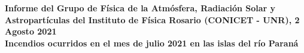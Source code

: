 \begin{center}
	\textbf{
		\textcolor{title}{Informe del Grupo de Física de la Atmósfera, Radiación Solar y Astropartículas del Instituto de Física Rosario (CONICET - UNR), 2 Agosto 2021\vspace{1cm}\\ }
		\textcolor{title}{Incendios ocurridos en el mes de julio 2021 en las islas del río Paraná}}
\end{center}
